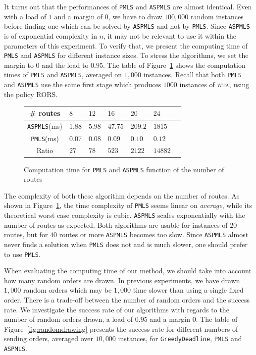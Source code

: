 \documentclass[a4paper,10pt]{journal}
\newcommand\greedydeadline{\texttt{GreedyDeadline}\xspace}
\newcommand\PMLS{\texttt{PMLS}\xspace}
\newcommand\ASPMLS{\texttt{ASPMLS}\xspace}
\newcommand\wta{\textsc{wta}\xspace}
\begin{document}
     It turns out that the performances of \PMLS and \ASPMLS are almost identical. Even with a load of $1$ and a margin of $0$, we have to draw $100,000$ random instances before finding one which can be solved by \ASPMLS and not by \PMLS. Since \ASPMLS is of exponential complexity in $n$, it may not be relevant to use it within the parameters of this experiment. To verify that, we present the computing time of \PMLS and \ASPMLS for different instance sizes. To stress the algorithms, we set the margin to $0$ and the load to $0.95$. The table of Figure~\ref{fig:tps_fpt} shows the computation times of \PMLS and \ASPMLS, averaged on $1,000$ instances. Recall that both \PMLS and \ASPMLS use the same first stage which produces $1000$ instances of \wta, using the policy RORS.

     
          \begin{figure}[h] 
       \begin{center}
   \begin{tabularx}{0.8\textwidth}{|c|X|X|X|X|X|X|}
    \hline
    \# routes& $8$ & $12$ & $16$& $20$ & $24$\\
    \hline
    \ASPMLS (ms) & $1.88$ &$5.98$&$47.75$&$209.2$&$1815$\\
    \hline
     \PMLS (ms) & $0.07$ &$0.08$&$0.09$&$0.10$&$0.12$\\
    \hline
    Ratio & $27$ &$78$&$523$&$2122$&$14882$\\
    \hline
      \end{tabularx}
      \end{center}
   \caption{Computation time for \PMLS and \ASPMLS function of the number of routes}
        \label{fig:tps_fpt}
     \end{figure}
    

  The complexity of both these algorithm depends on the number of routes. As shown in Figure~\ref{fig:tps_fpt}, the time complexity of \PMLS seems linear on \emph{average}, while its theoretical worst case complexity is cubic. \ASPMLS scales exponentially with the number of routes as expected. Both algorithms are usable for instances of $20$ routes, but for $40$ routes or more \ASPMLS becomes too slow. Since \ASPMLS almost never finds a solution when \PMLS does not and is much slower, one should prefer to use \PMLS. 

    When evaluating the computing time of our method, we should take into account how many random orders are drawn. In previous experiments, we have drawn $1,000$ random orders which may be $1,000$ time slower than using a single fixed order. There is a trade-off between the number of random orders and the success rate. We investigate the success rate of our algorithms with regards to the number of random orders drawn, a load of $0.95$ and a margin $0$. The table of Figure~\ref{fig:randomdrawing} presents the success rate for different numbers of sending orders, averaged over $10,000$ instances, for \greedydeadline, \PMLS and \ASPMLS.
\end{document}
